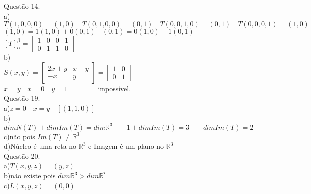 \documentclass[12pt]{article}
\begin{document}
\noindent Questão 14.\\

\noindent a)\\

$T(1,0,0,0)=(1,0)\quad T(0,1,0,0)=(0,1)\quad T(0,0,1,0)=(0,1)\quad T(0,0,0,1)=(1,0)$\\

$(1,0)=1(1,0)+0(0,1)\quad(0,1)=0(1,0)+1(0,1)$\\

$[T]_{\alpha}^{\beta}=\begin{bmatrix}1&0&0&1\\0&1&1&0\end{bmatrix}$\\

\noindent b)\\

$S(x,y)=\begin{bmatrix}2x+y&x-y\\-x&y\end{bmatrix}=\begin{bmatrix}1&0\\0&1\end{bmatrix}$\\

$x=y\quad x=0\quad y=1\qquad\qquad$ impossível.\\

\noindent Questão 19.\\

\noindent a)\quad$z=0\quad x=y\quad [(1,1,0)]$\\

\noindent b)\quad$dimN(T)+dimIm(T)=dim\mathds{R}^{3}\qquad 1+dimIm(T)=3\qquad dimIm(T)=2$\\

\noindent c)\quad não pois $Im(T)\neq\mathds{R}^{3}$\\

\noindent d)\quad Núcleo é uma reta no $\mathds{R}^{3}$ e Imagem é um plano no $\mathds{R}^{3}$\\

\noindent Questão 20.\\

\noindent a)\quad$T(x,y,z)=(y,z)$\\

\noindent b)\quad não existe pois $dim\mathds{R}^{3}>dim\mathds{R}^{2}$\\

\noindent c)\quad$L(x,y,z)=(0,0)$\\
\end{document}
